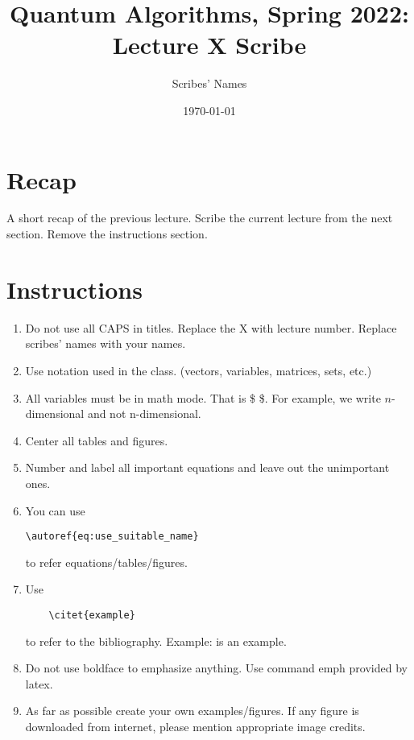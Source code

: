 \documentclass[11.5pt, paper=a4]{article}
\title{Quantum Algorithms, Spring 2022: Lecture X Scribe}
\author{Scribes' Names}
\date{\today}
\theoremstyle{definition}
\numberwithin{theorem}{section}
\begin{document}
\maketitle

\section{Recap}

A short recap of the previous lecture. Scribe the current lecture from the next section. Remove the instructions section.

\section{Instructions}

\begin{enumerate}
\item Do not use all CAPS in titles. Replace the X with lecture number. Replace scribes' names with your names.

\item Use notation used in the class. (vectors, variables, matrices, sets, etc.)

\item All variables must be in math mode. That is \$ \$. 
For example, we write  $n$-dimensional and not n-dimensional. 

\item Center all tables and figures. 

\item Number and label all important equations and leave out the unimportant ones. 

\item You can use \begin{verbatim}
\autoref{eq:use_suitable_name}
\end{verbatim} to refer equations/tables/figures.

\item Use \begin{verbatim}
    \citet{example}
\end{verbatim} to refer to the bibliography. Example: \citet{example} is an example.

\item Do not use boldface to emphasize anything. Use command emph provided by latex.

\item As far as possible create your own examples/figures.
If any figure is downloaded from internet, please mention appropriate image credits.


\end{enumerate}
\end{document}
